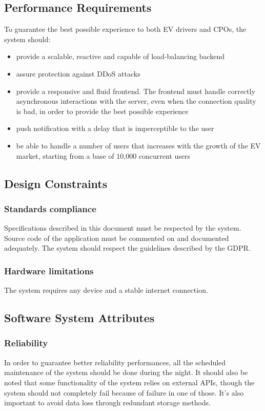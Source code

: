 \subsection{Performance Requirements}
To guarantee the best possible experience to both EV drivers and CPOs, the system should:
\begin{itemize}
    \item provide a scalable, reactive and capable of load-balancing backend
    \item assure protection against DDoS attacks
    \item provide a responsive and fluid frontend. The frontend must handle correctly asynchronous interactions
          with the server, even when the connection quality is bad, in order to provide the best possible experience
    \item push notification with a delay that is imperceptible to the user
    \item be able to handle a number of users that increases with the growth of the EV market, starting from a base of 10,000 concurrent users
\end{itemize}

\subsection{Design Constraints}


\subsubsection{Standards compliance}
Specifications described in this document must be respected by the system.
Source code of the application must be commented on and documented adequately.
The system should respect the guidelines described by the GDPR.

\subsubsection{Hardware limitations}
The system requires any device and a stable internet connection.

\subsection{Software System Attributes}
\subsubsection{Reliability}
In order to guarantee better reliability performances, all
the scheduled maintenance of the system should be done during
the night.
It should also be noted that some functionality of the system relies on external APIs, though the system should not completely fail
because of failure in one of those. It's also important to avoid data loss through redundant storage methods.

